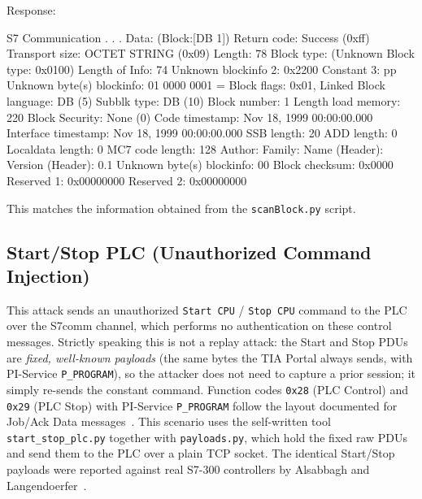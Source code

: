﻿\documentclass[../main.tex]{subfiles}
\begin{document}
\begin{enumerate}
\begin{enumerate}[label=(\alph*), leftmargin=*]
Response:


\begin{packetdump}
S7 Communication
    . . .
    Data: (Block:[DB 1])
        Return code: Success (0xff)
        Transport size: OCTET STRING (0x09)
        Length: 78
        Block type:  (Unknown Block type: 0x0100)
        Length of Info: 74
        Unknown blockinfo 2: 0x2200
        Constant 3: pp
        Unknown byte(s) blockinfo: 01
        0000 0001 = Block flags: 0x01, Linked
        Block language: DB (5)
        Subblk type: DB (10)
        Block number: 1
        Length load memory: 220
        Block Security: None (0)
        Code timestamp: Nov 18, 1999 00:00:00.000
        Interface timestamp: Nov 18, 1999 00:00:00.000
        SSB length: 20
        ADD length: 0
        Localdata length: 0
        MC7 code length: 128
        Author: 
        Family: 
        Name (Header): 
        Version (Header): 0.1
        Unknown byte(s) blockinfo: 00
        Block checksum: 0x0000
        Reserved 1: 0x00000000
        Reserved 2: 0x00000000
\end{packetdump}

\end{enumerate}


This matches the information obtained from the \texttt{scanBlock.py} script.

\end{enumerate}


\subsection{Start/Stop PLC (Unauthorized Command Injection)}
\label{sec:start_stop_plc}


This attack sends an unauthorized \texttt{Start CPU} / \texttt{Stop CPU} command to the PLC over the S7comm channel, which performs no authentication on these control messages. Strictly speaking this is not a replay attack: the Start and Stop PDUs are \emph{fixed, well-known payloads} (the same bytes the TIA Portal always sends, with PI-Service \texttt{P\_PROGRAM}), so the attacker does not need to capture a prior session; it simply re-sends the constant command. Function codes \texttt{0x28} (PLC Control) and \texttt{0x29} (PLC Stop) with PI-Service \texttt{P\_PROGRAM} follow the layout documented for Job/Ack Data messages~\cite{gmiru_s7comm_part2}. This scenario uses the self-written tool \texttt{start\_stop\_plc.py} together with \texttt{payloads.py}, which hold the fixed raw PDUs and send them to the PLC over a plain TCP socket. The identical Start/Stop payloads were reported against real S7-300 controllers by Alsabbagh and Langendoerfer~\cite{alsabbagh2022remote}.
\end{document}
